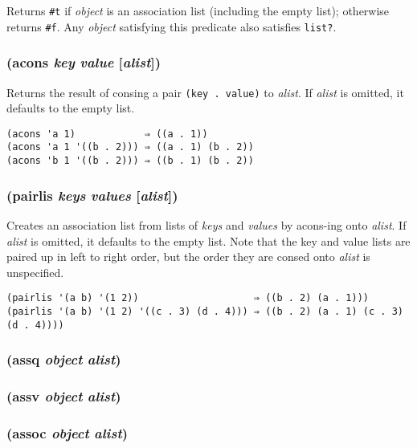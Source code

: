 \documentclass{article}
\begin{document}
Returns \verb|#t| if \emph{object} is an association list (including the empty list);
otherwise returns \verb|#f|. Any \emph{object} satisfying this predicate also satisfies
\verb|list?|.

\subsubsection{(acons \emph{key} \emph{value} [\emph{alist}])}

Returns the result of consing a pair \verb|(key . value)| to \emph{alist}. If \emph{alist} is
omitted, it defaults to the empty list.

\begin{verbatim}
(acons 'a 1)            ⇒ ((a . 1))
(acons 'a 1 '((b . 2))) ⇒ ((a . 1) (b . 2))
(acons 'b 1 '((b . 2))) ⇒ ((b . 1) (b . 2))
\end{verbatim}

\subsubsection{(pairlis \emph{keys} \emph{values} [\emph{alist}])}

Creates an association list from lists of \emph{keys} and \emph{values} by acons-ing onto
\emph{alist}. If \emph{alist} is omitted, it defaults to the empty list. Note that the key and
value lists are paired up in left to right order, but the order they are consed onto
\emph{alist} is unspecified.

\begin{verbatim}
(pairlis '(a b) '(1 2))                    ⇒ ((b . 2) (a . 1)))
(pairlis '(a b) '(1 2) '((c . 3) (d . 4))) ⇒ ((b . 2) (a . 1) (c . 3) (d . 4))))
\end{verbatim}

\subsubsection{(assq \emph{object} \emph{alist})}

\subsubsection{(assv \emph{object} \emph{alist})}

\subsubsection{(assoc \emph{object} \emph{alist})}
\end{document}

